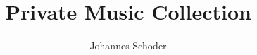 \documentclass[a4paper,oneside,10pt]{report}
\begin{document}
\setlength{\parindent}{0em}
\pagestyle{empty} %



\title{Private Music Collection}
\author{Johannes Schoder}
\maketitle



\tableofcontents %
\cleardoublepage %

\pagestyle{plain} %



%

%

%

%

\end{document}
